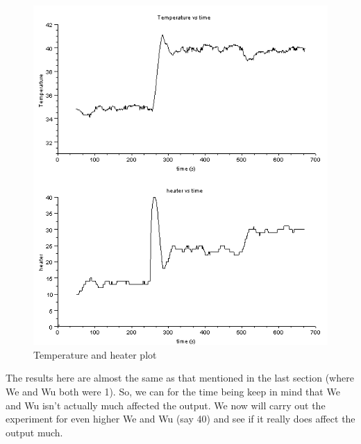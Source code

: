 \begin{figure}[H]
\centering
  \includegraphics[width=0.8\linewidth]{mpc/1_2_heater_final.png}
  \caption{Temperature and heater plot}
\end{figure}
The results here are almost the same as that mentioned in the last section (where We and Wu both were 1). So, we can for the time being keep in mind that We and Wu isn't actually much affected the output. We now will carry out the experiment for even higher We and Wu (say 40) and see if it really does affect the output much.


